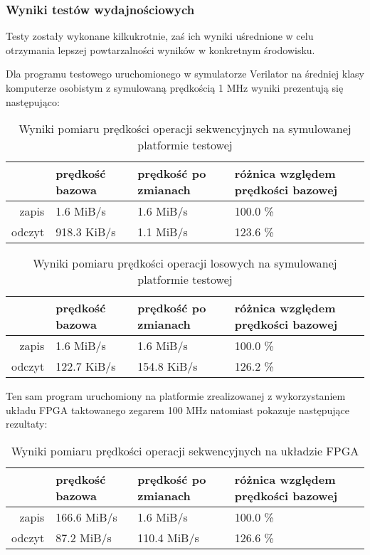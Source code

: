 \subsubsection{Wyniki testów wydajnościowych}

Testy zostały wykonane kilkukrotnie, zaś ich wyniki uśrednione w celu otrzymania lepszej powtarzalności wyników w konkretnym środowisku.

Dla programu testowego uruchomionego w symulatorze Verilator na średniej klasy komputerze osobistym z symulowaną prędkością 1 MHz wyniki prezentują się następująco:

\begin{center}

\begin{table}[H]
\begin{tabular}{ r|l|l|l| }
  & prędkość bazowa & prędkość po zmianach & różnica względem prędkości bazowej\\
 \hline
 zapis & 1.6 MiB/s & 1.6 MiB/s & 100.0 \%\\
 odczyt & 918.3 KiB/s & 1.1 MiB/s & 123.6 \%\\
 \hline
\end{tabular}
\caption{\label{tab:benchmark-seq-sim}Wyniki pomiaru prędkości operacji sekwencyjnych na symulowanej platformie testowej}
\end{table}

\begin{table}[H]
\begin{tabular}{ r|l|l|l| }
  & prędkość bazowa & prędkość po zmianach & różnica względem prędkości bazowej\\
 \hline
 zapis & 1.6 MiB/s & 1.6 MiB/s & 100.0 \%\\
 odczyt & 122.7 KiB/s & 154.8 KiB/s & 126.2 \%\\
 \hline
\end{tabular}
\caption{\label{tab:benchmark-rnd-sim}Wyniki pomiaru prędkości operacji losowych na symulowanej platformie testowej}
\end{table}

\end{center}

Ten sam program uruchomiony na platformie zrealizowanej z wykorzystaniem układu FPGA taktowanego zegarem 100 MHz natomiast pokazuje następujące rezultaty:

\begin{table}[H]
\begin{center}
\begin{tabular}{ r|l|l|l| }
  & prędkość bazowa & prędkość po zmianach & różnica względem prędkości bazowej\\
 \hline
 zapis & 166.6 MiB/s & 1.6 MiB/s & 100.0 \%\\
 odczyt & 87.2 MiB/s & 110.4 MiB/s & 126.6 \%\\
 \hline
\end{tabular}
\end{center}
\caption{\label{tab:benchmark-seq-arty}Wyniki pomiaru prędkości operacji sekwencyjnych na układzie FPGA}
\end{table}

